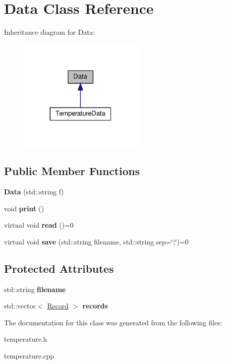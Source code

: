 \hypertarget{classData}{}\section{Data Class Reference}
\label{classData}


Inheritance diagram for Data\+:\nopagebreak
\begin{figure}[H]
\begin{center}
\leavevmode
\includegraphics[width=172pt]{classData__inherit__graph}
\end{center}
\end{figure}
\subsection*{Public Member Functions}
\begin{DoxyCompactItemize}
\item 
{\bfseries Data} (std\+::string f)\hypertarget{classData_aaf6b0da495803c494a6c6a9f89021403}{}\label{classData_aaf6b0da495803c494a6c6a9f89021403}

\item 
void {\bfseries print} ()\hypertarget{classData_a779ce878d01483220b49ad9e513d7366}{}\label{classData_a779ce878d01483220b49ad9e513d7366}

\item 
virtual void {\bfseries read} ()=0\hypertarget{classData_a16a784e96cd5e92785a0c4f2824284c7}{}\label{classData_a16a784e96cd5e92785a0c4f2824284c7}

\item 
virtual void {\bfseries save} (std\+::string filename, std\+::string sep=\char`\"{};\char`\"{})=0\hypertarget{classData_a2e10a8a62cb83a4299c9bff0ef71bdf9}{}\label{classData_a2e10a8a62cb83a4299c9bff0ef71bdf9}

\end{DoxyCompactItemize}
\subsection*{Protected Attributes}
\begin{DoxyCompactItemize}
\item 
std\+::string {\bfseries filename}\hypertarget{classData_a2cbdf542620c5f62b3e504ea2cecffd0}{}\label{classData_a2cbdf542620c5f62b3e504ea2cecffd0}

\item 
std\+::vector$<$ \hyperlink{structRecord}{Record} $>$ {\bfseries records}\hypertarget{classData_ab886b83cfa461cc7def5c0e8ba870d7c}{}\label{classData_ab886b83cfa461cc7def5c0e8ba870d7c}

\end{DoxyCompactItemize}


The documentation for this class was generated from the following files\+:\begin{DoxyCompactItemize}
\item 
temperature.\+h\item 
temperature.\+cpp\end{DoxyCompactItemize}
